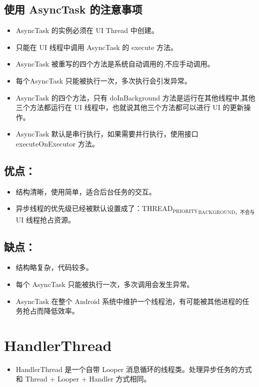 \documentclass[9pt, b5paper]{article}
\begin{document}
\subsection{使用 AsyncTask 的注意事项}
\label{sec-3-1}
\begin{itemize}
\item AsyncTask 的实例必须在 UI Thread 中创建。
\item 只能在 UI 线程中调用 AsyncTask 的 execute 方法。
\item AsyncTask 被重写的四个方法是系统自动调用的,不应手动调用。
\item 每个AsyncTask 只能被执行一次，多次执行会引发异常。
\item AsyncTask 的四个方法，只有 doInBackground 方法是运行在其他线程中,其他三个方法都运行在 UI 线程中，也就说其他三个方法都可以进行 UI 的更新操作。
\item AsyncTask 默认是串行执行，如果需要并行执行，使用接口 executeOnExecutor 方法。
\end{itemize}
\subsection{优点：}
\label{sec-3-2}
\begin{itemize}
\item 结构清晰，使用简单，适合后台任务的交互。
\item 异步线程的优先级已经被默认设置成了：THREAD$_{\text{PRIORITY}}$$_{\text{BACKGROUND，不会与}}$ UI 线程抢占资源。
\end{itemize}
\subsection{缺点：}
\label{sec-3-3}
\begin{itemize}
\item 结构略复杂，代码较多。
\item 每个 AsyncTask 只能被执行一次，多次调用会发生异常。
\item AsyncTask 在整个 Android 系统中维护一个线程池，有可能被其他进程的任务抢占而降低效率。
\end{itemize}

\section{HandlerThread}
\label{sec-4}
\begin{itemize}
\item HandlerThread 是一个自带 Looper 消息循环的线程类。处理异步任务的方式和 Thread + Looper + Handler 方式相同。
\end{itemize}
\end{document}
